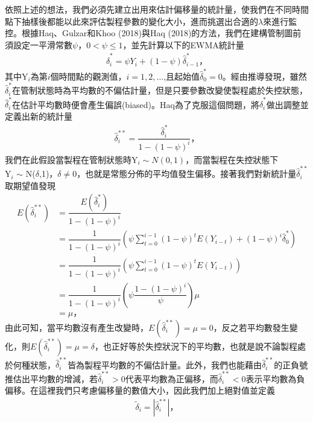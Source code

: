 \documentclass[12pt]{article}  %
\theoremstyle{plain}
\begin{document}
依照上述的想法，我們必須先建立出用來估計偏移量的統計量，使我們在不同時間點下抽樣後都能以此來評估製程參數的變化大小，進而挑選出合適的$\lambda$來進行監控。根據Haq、Gulzar和Khoo (2018)與Haq (2018)的方法，我們在建構管制圖前須設定一平滑常數$\psi$，$0<\psi \leq 1$，並先計算以下的EWMA統計量
\begin{align}
\widehat{\delta}^*_{i}=\psi Y_i+\left(1-\psi\right) \widehat{\delta}^*_{i-1} \mbox{，}
\end{align}
其中Y$_i$為第$i$個時間點的觀測值，$i=1,2,\ldots$,且起始值$\widehat{\delta}^*_{0}=0$。經由推導發現，雖然$\widehat{\delta}^*_{i}$在管制狀態時為平均數的不偏估計量，但是只要參數改變使製程處於失控狀態，$\widehat{\delta}^*_{i}$在估計平均數時便會產生偏誤(biased)。Haq為了克服這個問題，將$\widehat{\delta}^*_{i}$做出調整並定義出新的統計量
\begin{align}
\widehat{\delta}^{**}_{i}=\dfrac{\widehat{\delta}^*_{i}}{1-\left(1-\psi\right)^i} \mbox{，}
\end{align}
我們在此假設當製程在管制狀態時Y$_i \sim N(0,1)$，而當製程在失控狀態下\\Y$_i$ $\sim$ N($\delta$,1)，$\delta \neq 0$，也就是常態分佈的平均值發生偏移。接著我們對新統計量$\widehat{\delta}^{**}_{i}$取期望值發現
\begin{align*}
E(\widehat{\delta}^{**}_{i})&=\dfrac{E(\widehat{\delta}^*_{i})}{1-\left(1-\psi\right)^i}\\
&=\dfrac{1}{1-\left(1-\psi\right)^i} \left(\psi \sum^{i-1}_{t=0}\left(1-\psi\right)^{t} E(Y_{i-t})+\left(1-\psi\right)^i \widehat{\delta}^*_{0}\right)\\
&=\dfrac{1}{1-\left(1-\psi\right)^i} \left(\psi \sum^{i-1}_{t=0}\left(1-\psi\right)^{t} E(Y_{i-t})\right)\\
&=\dfrac{1}{1-\left(1-\psi\right)^i} \left(\psi \dfrac{1-\left(1-\psi\right)^i}{\psi} \right)  \mu \\
&= \mu \mbox{，}
\end{align*}
由此可知，當平均數沒有產生改變時，$E(\widehat{\delta}^{**}_{i})=\mu=0$，反之若平均數發生變化，則$E(\widehat{\delta}^{**}_{i})=\mu=\delta $，也正好等於失控狀況下的平均數，也就是說不論製程處於何種狀態，$\widehat{\delta}^{**}_{i}$皆為製程平均數的不偏估計量。此外，我們也能藉由$\widehat{\delta}^{**}_{i}$的正負號推估出平均數的增減，若$\widehat{\delta}^{**}_{i}>0$代表平均數為正偏移，而$\widehat{\delta}^{**}_{i}<0$表示平均數為負偏移。在這裡我們只考慮偏移量的數值大小，因此我們加上絕對值並定義   
\begin{align}
\tilde{\delta}_i=\left|\widehat{\delta}^{**}_{i}\right| \mbox{，}
\end{align}
\end{document}
